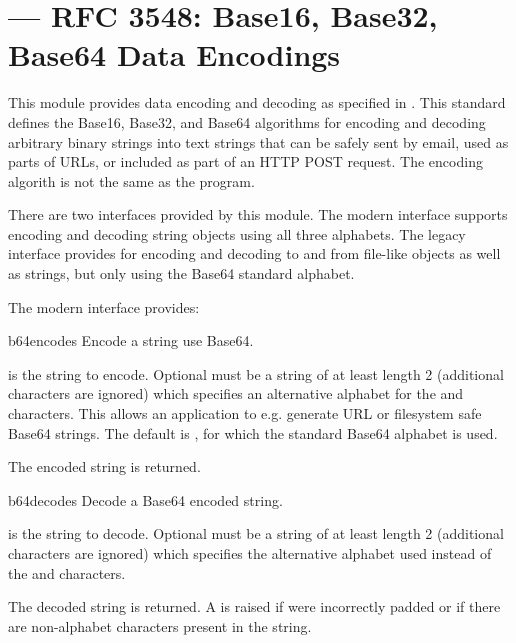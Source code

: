 \section{ ---
	 RFC 3548: Base16, Base32, Base64 Data Encodings}




This module provides data encoding and decoding as specified in
.  This standard defines the Base16, Base32, and Base64
algorithms for encoding and decoding arbitrary binary strings into
text strings that can be safely sent by email, used as parts of URLs,
or included as part of an HTTP POST request.  The encoding algorith is
not the same as the  program.

There are two interfaces provided by this module.  The modern
interface supports encoding and decoding string objects using all
three alphabets.  The legacy interface provides for encoding and
decoding to and from file-like objects as well as strings, but only
using the Base64 standard alphabet.

The modern interface provides:

\begin{funcdesc}{b64encode}{s}
Encode a string use Base64.

 is the string to encode.  Optional  must be a
string of at least length 2 (additional characters are ignored) which
specifies an alternative alphabet for the \code{+} and \code{/}
characters.  This allows an application to e.g. generate URL or
filesystem safe Base64 strings.  The default is , for which
the standard Base64 alphabet is used.

The encoded string is returned.
\end{funcdesc}

\begin{funcdesc}{b64decode}{s}
Decode a Base64 encoded string.

 is the string to decode.  Optional  must be a
string of at least length 2 (additional characters are ignored) which
specifies the alternative alphabet used instead of the \code{+} and
\code{/} characters.

The decoded string is returned.  A  is raised if
 were incorrectly padded or if there are non-alphabet
characters present in the string.
\end{funcdesc}

